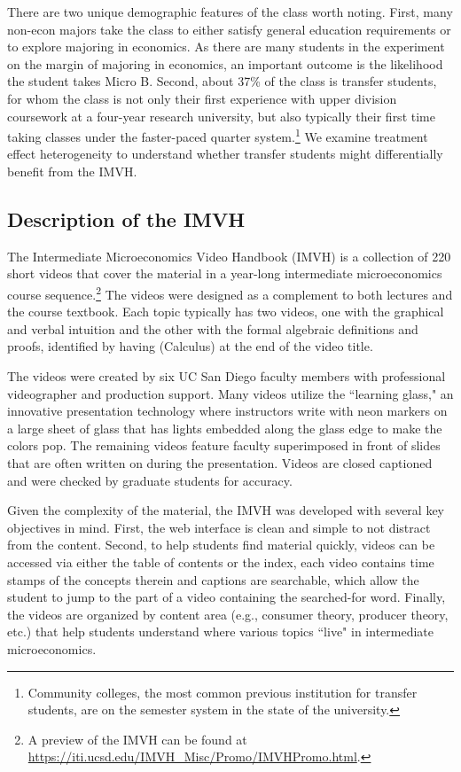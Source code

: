 \documentclass[12pt]{article}
\begin{document}
There are two unique demographic features of the class worth noting. First, many non-econ majors take the class to either satisfy general education requirements or to explore majoring in economics. As there are many students in the experiment on the margin of majoring in economics, an important outcome is the likelihood the student takes Micro B. Second, about 37\% of the class is transfer students, for whom the class is not only their first experience with upper division coursework at a four-year research university, but also typically their first time taking classes under the faster-paced quarter system.\footnote{Community colleges, the most common previous institution for transfer students, are on the semester system in the state of the university.} We examine treatment effect heterogeneity to understand whether transfer students might differentially benefit from the IMVH.

\subsection{Description of the IMVH}

The Intermediate Microeconomics Video Handbook (IMVH) is a collection of 220 short videos that cover the material in a year-long intermediate microeconomics course sequence.\footnote{A preview of the IMVH can be found at \url{https://iti.ucsd.edu/IMVH_Misc/Promo/IMVHPromo.html}.} The videos were designed as a complement to both lectures and the course textbook. Each topic typically has two videos, one with the graphical and verbal intuition and the other with the formal algebraic definitions and proofs, identified by having (Calculus) at the end of the video title.

The videos were created by six UC San Diego faculty members with professional videographer and production support. Many videos utilize the ``learning glass," an innovative presentation technology where instructors write with neon markers on a large sheet of glass that has lights embedded along the glass edge to make the colors pop. The remaining videos feature faculty superimposed in front of slides that are often written on during the presentation. Videos are closed captioned and were checked by graduate students for accuracy.

Given the complexity of the material, the IMVH was developed with several key objectives in mind. First, the web interface is clean and simple to not distract from the content. Second, to help students find material quickly, videos can be accessed via either the table of contents or the index, each video contains time stamps of the concepts therein and captions are searchable, which allow the student to jump to the part of a video containing the searched-for word. Finally, the videos are organized by content area (e.g., consumer theory, producer theory, etc.) that help students understand where various topics ``live" in intermediate microeconomics.
\end{document}
